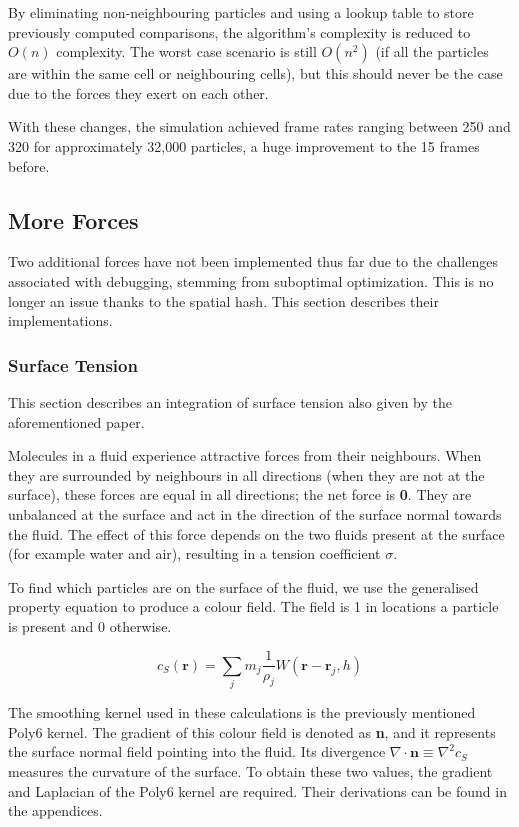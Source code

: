 \documentclass[a4paper, 12pt]{article}
\begin{document}
    By eliminating non-neighbouring particles and using a lookup table to store previously computed comparisons, the algorithm's complexity is reduced to $O(n)$ complexity. The worst case scenario is still $O(n^2)$ (if all the particles are within the same cell or neighbouring cells), but this should never be the case due to the forces they exert on each other. 

    With these changes, the simulation achieved frame rates ranging between 250 and 320 for approximately 32,000 particles, a huge improvement to the 15 frames before.

    \subsection{More Forces}

    Two additional forces have not been implemented thus far due to the challenges associated with debugging, stemming from suboptimal optimization. This is no longer an issue thanks to the spatial hash. This section describes their implementations.

    \subsubsection{Surface Tension}

    This section describes an integration of surface tension also given by the aforementioned paper\cite{sca}.

    Molecules in a fluid experience attractive forces from their neighbours. When they are surrounded by neighbours in all directions (when they are not at the surface), these forces are equal in all directions; the net force is \textbf{0}. They are unbalanced at the surface and act in the direction of the surface normal towards the fluid. The effect of this force depends on the two fluids present at the surface (for example water and air), resulting in a tension coefficient $\sigma$.

    To find which particles are on the surface of the fluid, we use the generalised property equation to produce a colour field. The field is 1 in locations a particle is present and 0 otherwise.

    \begin{equation}
        c_S(\textbf{r}) = \sum_{j}{m_j \frac{1}{\rho_j}W(\textbf{r} - \textbf{r}_j, h)}
    \end{equation}

    The smoothing kernel used in these calculations is the previously mentioned Poly6 kernel. The gradient of this colour field is denoted as \textbf{n}, and it represents the surface normal field pointing into the fluid. Its divergence $\nabla \cdot \textbf{n} \equiv \nabla^2 c_S$ measures the curvature of the surface. To obtain these two values, the gradient and Laplacian of the Poly6 kernel are required. Their derivations can be found in the appendices.
\end{document}
